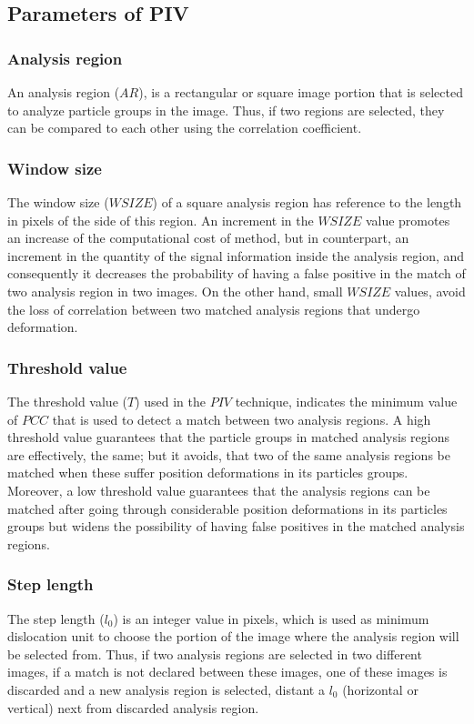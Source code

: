 \subsection{Parameters of PIV}
\label{sec:systemdesc}

\subsubsection{Analysis region}
An analysis region ($AR$), is a rectangular or square
image portion that is selected to analyze particle groups in the image.
Thus, if two regions are selected, they can be compared to each other using the correlation coefficient.


\subsubsection{Window size}
The window size ($WSIZE$) of a square analysis region
has reference to the length in pixels of the side of this region.
An increment in the $WSIZE$ value promotes an increase of the computational cost of 
method, but in counterpart, an increment in the quantity of the signal information
inside the analysis region, and consequently it decreases the probability of having
a false positive in the match of two analysis region in two images.
On the other hand, small $WSIZE$ values, avoid the loss of correlation 
between two matched analysis regions that undergo deformation.

\subsubsection{Threshold value}
The threshold value ($T$) used in the $PIV$ technique, indicates the minimum value
of $PCC$ that is used to detect a match between two analysis regions.
A high threshold value guarantees that the particle groups in matched 
analysis regions are effectively, the same; but it avoids, that two of the same 
analysis regions be matched when these suffer position deformations in its
particles groups.
Moreover, a low threshold value guarantees that the analysis regions 
can be matched after going through considerable  position deformations in 
its particles groups but widens the possibility of having false positives 
in the matched analysis regions.

\subsubsection{Step length}
The step length ($l_0$) is an integer value in pixels, which is used as minimum dislocation unit 
to choose the portion of the image where the analysis region will be selected from.
Thus, if two analysis regions are selected in two different images, if a match
is not declared between these images, one of these images is discarded and
a new analysis region is selected, distant a $l_0$ (horizontal or vertical) next from
discarded analysis region.


